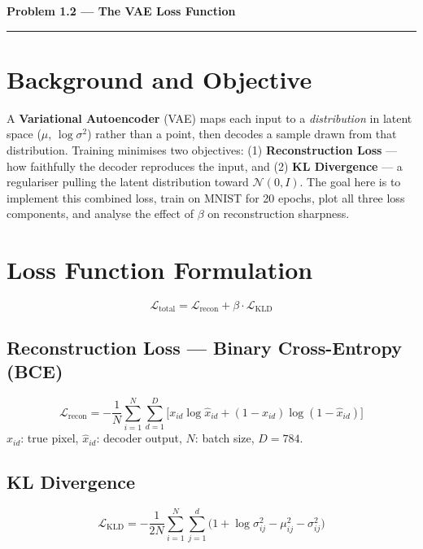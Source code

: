 \documentclass[11pt, a4paper]{article}
\begin{document}
\begin{center}
  {\large\textbf{Problem 1.2 --- The VAE Loss Function}}
\end{center}
\vspace{-0.3em}\hrule\vspace{0.6em}

\section{Background and Objective}

A \textbf{Variational Autoencoder} (VAE) maps each input to a \emph{distribution}
in latent space ($\mu$, $\log\sigma^2$) rather than a point, then decodes a sample
drawn from that distribution. Training minimises two objectives: (1)
\textbf{Reconstruction Loss} --- how faithfully the decoder reproduces the input,
and (2) \textbf{KL Divergence} --- a regulariser pulling the latent distribution
toward $\mathcal{N}(0,I)$. The goal here is to implement this combined loss, train
on MNIST for 20 epochs, plot all three loss components, and analyse the effect of
$\beta$ on reconstruction sharpness.

\section{Loss Function Formulation}

\[
  \mathcal{L}_{\text{total}} = \mathcal{L}_{\text{recon}} + \beta\cdot\mathcal{L}_{\text{KLD}}
\]

\subsection*{Reconstruction Loss --- Binary Cross-Entropy (BCE)}
\[
  \mathcal{L}_{\text{recon}}
    = -\frac{1}{N}\sum_{i=1}^{N}\sum_{d=1}^{D}
      \bigl[x_{id}\log\hat{x}_{id} + (1-x_{id})\log(1-\hat{x}_{id})\bigr]
\]
$x_{id}$: true pixel, $\hat{x}_{id}$: decoder output, $N$: batch size, $D=784$.

\subsection*{KL Divergence}
\[
  \mathcal{L}_{\text{KLD}}
    = -\frac{1}{2N}\sum_{i=1}^{N}\sum_{j=1}^{d}
      \bigl(1 + \log\sigma_{ij}^2 - \mu_{ij}^2 - \sigma_{ij}^2\bigr)
\]
\end{document}
